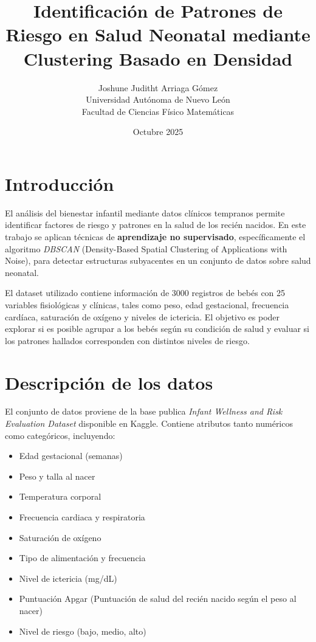 \documentclass[12pt]{article}
\title{\textbf{Identificación de Patrones de Riesgo en Salud Neonatal mediante Clustering Basado en Densidad}}
\author{
    Joshune Juditht Arriaga Gómez\\
    \small Universidad Autónoma de Nuevo León \\ \small Facultad de Ciencias Físico Matemáticas
}
\date{Octubre 2025}
\begin{document}
\maketitle


\section{Introducción}

El análisis del bienestar infantil mediante datos clínicos tempranos permite identificar factores de riesgo y patrones en la salud de los recién nacidos. En este trabajo se aplican técnicas de \textbf{aprendizaje no supervisado}, específicamente el algoritmo \emph{DBSCAN} (Density-Based Spatial Clustering of Applications with Noise), para detectar estructuras subyacentes en un conjunto de datos sobre salud neonatal. 

El dataset utilizado contiene información de 3000 registros de bebés con 25 variables fisiológicas y clínicas, tales como peso, edad gestacional, frecuencia cardíaca, saturación de oxígeno y niveles de ictericia. El objetivo es poder explorar si es posible agrupar a los bebés según su condición de salud y evaluar si los patrones hallados corresponden con distintos niveles de riesgo.

\section{Descripción de los datos}

El conjunto de datos proviene de la base publica \emph{Infant Wellness and Risk Evaluation Dataset} disponible en Kaggle. Contiene atributos tanto numéricos como categóricos, incluyendo:

\begin{itemize}
\item Edad gestacional (semanas)
\item Peso y talla al nacer
\item Temperatura corporal
\item Frecuencia cardiaca y respiratoria
\item Saturación de oxígeno
\item Tipo de alimentación y frecuencia
\item Nivel de ictericia (mg/dL)
\item Puntuación Apgar (Puntuación de salud del recién nacido según el peso al nacer)
\item Nivel de riesgo (bajo, medio, alto)
\end{itemize}
\end{document}
